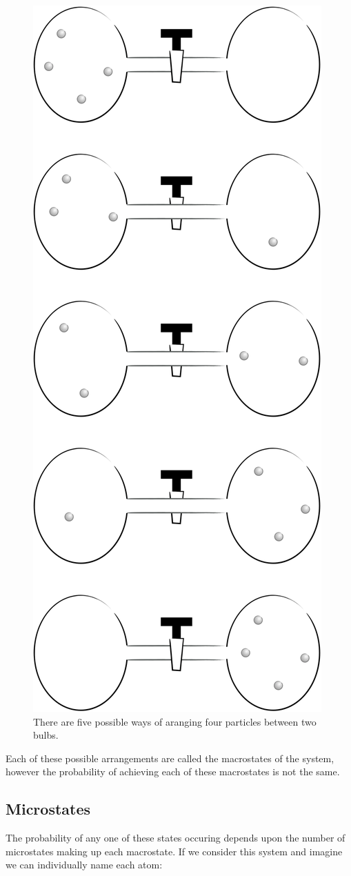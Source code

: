 \documentclass[
]{book}
\begin{document}
\begin{figure}

{\centering \includegraphics[width=0.5\linewidth]{images/macro} 

}

\caption{There are five possible ways of aranging four particles between two bulbs.}\label{fig:macro}
\end{figure}

Each of these possible arrangements are called the macrostates of the system, however the probability of achieving each of these macrostates is not the same.

\hypertarget{microstates}{%
\subsection{Microstates}\label{microstates}}

The probability of any one of these states occuring depends upon the number of microstates making up each macrostate. If we consider this system and imagine we can individually name each atom:
\end{document}
